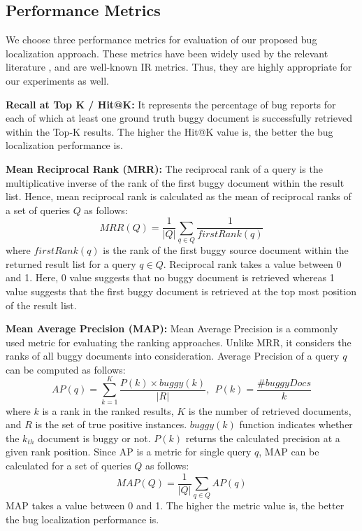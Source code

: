 \documentclass[sigconf,review,anonymous]{acmart}
\begin{document}
\subsection{Performance Metrics}\label{sec:pmetrics}
We choose three performance metrics for evaluation of our proposed bug localization approach. These metrics have been widely used by the relevant literature \cite{Jian, Saha}, and are well-known IR metrics. Thus, they are highly appropriate for our experiments as well.

\textbf{Recall at Top K / Hit@K:} It represents the percentage of bug reports for each of which at least one ground truth buggy document is successfully retrieved within the Top-K results. 
The higher the Hit@K value is, the better the bug localization performance is.

\textbf{Mean Reciprocal Rank (MRR):}
The reciprocal rank of a query is the multiplicative inverse of the rank of the first buggy document within the result list. Hence, mean reciprocal rank is calculated as the mean of reciprocal ranks of a set of queries $Q$ as follows:
\begin{equation*}
MRR(Q) = \frac{1}{\left | Q \right |}\sum_{q\in Q}\frac{1}{firstRank(q)}
\end{equation*}
where $firstRank(q)$ is the rank of the first buggy source document within the returned result list for a query $q\in Q$. Reciprocal rank takes a value between 0 and 1. Here, 0 value suggests that no buggy document is retrieved whereas 1 value suggests that the first buggy document is retrieved at the top most position of the result list.

\textbf{Mean Average Precision (MAP):}
Mean Average Precision is a commonly used metric for evaluating the ranking approaches. Unlike MRR, it considers the ranks of all buggy documents into consideration. 
Average Precision of a query $q$ can be computed as follows:
\begin{equation*}
AP(q)=\sum_{k=1}^{K}\frac{P(k)\times buggy(k)}{|R|},~~P(k)=\frac{\#buggyDocs}{k}
\end{equation*}
where $k$ is a rank in the ranked results, $K$ is the number of retrieved documents, and $R$ is the set of true positive instances. $buggy(k)$ function indicates whether the $k_{th}$ document is buggy or not. $P(k)$ returns the calculated precision at a given rank position. Since AP is a metric for single query $q$, MAP can be calculated for a set of queries $Q$ as follows:
\begin{equation*}
MAP(Q) = \frac{1}{|Q|}\sum_{q\in Q}AP(q)
\end{equation*}
MAP takes a value between 0 and 1. The higher the metric value is, the better the bug localization performance is.
\end{document}
